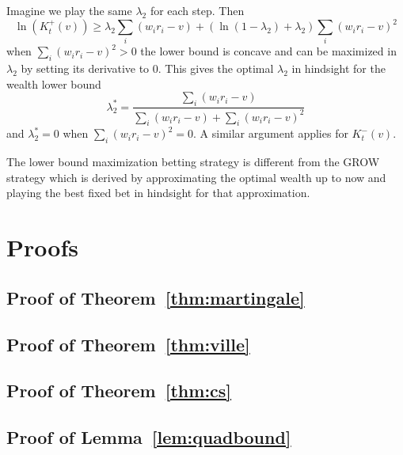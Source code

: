 Imagine we play the same $\lambda_2$ for each step. Then
\[
\ln(K_t^{+}(v)) \geq \lambda_2 \sum_i (w_i r_i -v) + \left(\ln\left(1-\lambda_2\right)+\lambda_2\right) \sum_i (w_i r_i -v)^2
\]
when $\sum_i (w_i r_i -v)^2>0$ the lower bound is concave and can 
be maximized in $\lambda_2$ by setting its derivative to 0. This gives
the optimal $\lambda_2$ in hindsight for the wealth lower bound 
\[
\lambda_2^* = \frac{\sum_i (w_i r_i -v)}{\sum_i (w_i r_i -v)+\sum_i (w_i r_i -v)^2}
\]
and $\lambda_2^*=0$ when $\sum_i (w_i r_i -v)^2=0$. A similar argument 
applies for $K_t^{-}(v)$.

The lower bound maximization betting strategy is different from 
the GROW strategy \cite{waudby-smith_variance-adaptive_2020} 
which is derived by approximating the optimal wealth up to now 
and playing the best fixed bet in hindsight for that approximation.






\newpage
\onecolumn
\appendix
\section{Proofs}

\subsection{Proof of Theorem~\ref{thm:martingale}}
\subsection{Proof of Theorem~\ref{thm:ville}}
\subsection{Proof of Theorem~\ref{thm:cs}}
\subsection{Proof of Lemma~\ref{lem:quadbound}}
